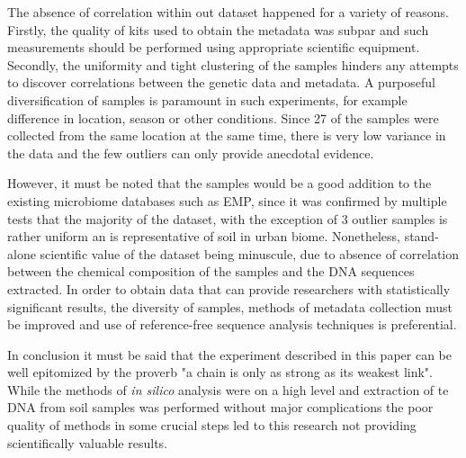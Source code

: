 \documentclass[12pt,twocolumn]{article} %
\begin{document}
\par
The absence of correlation within out dataset happened for a variety of reasons. Firstly, the quality of kits used to obtain the metadata was subpar and such measurements should be performed using appropriate scientific equipment. Secondly, the uniformity and tight clustering of the samples hinders any attempts to discover correlations between the genetic data and metadata. A purposeful diversification of samples is paramount in such experiments, for example difference in location, season or other conditions. Since 27 of the samples were collected from the same location at the same time, there is very low variance in the data and the few outliers can only provide anecdotal evidence.
\par
However, it must be noted that the samples would be a good addition to the existing microbiome databases such as EMP, since it was confirmed by multiple tests that the majority of the dataset, with the exception of 3 outlier samples is rather uniform an is representative of soil in urban biome. Nonetheless, stand-alone scientific value of the dataset being minuscule, due to absence of correlation between the chemical composition of the samples and the DNA sequences extracted. In order to obtain data that can provide researchers with statistically significant results, the diversity of samples, methods of metadata collection must be improved and use of reference-free sequence analysis techniques is preferential.
\par
In conclusion it must be said that the experiment described in this paper can be well epitomized by the proverb "a chain is only as strong as its weakest link". While the methods of \textit{in silico} analysis were on a high level and extraction of te DNA from soil samples was performed without major complications the poor quality of methods in some crucial steps led to this research not providing scientifically valuable results. 



\end{document}
